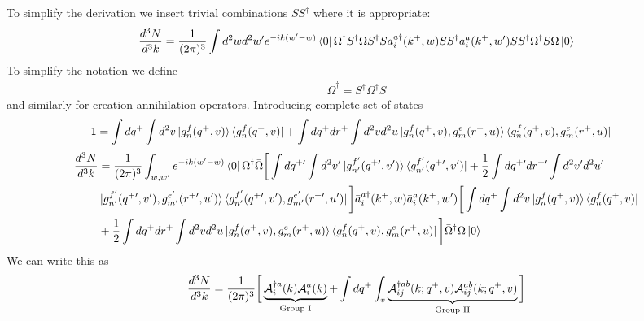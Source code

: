 \documentclass[aps,prd,amsmath,amssymb,nofootinbib]{revtex4-2}
\numberwithin{equation}{section}
\begin{document}
To simplify the derivation we insert trivial combinations $S S^\dagger$ where it is appropriate: 
\begin{equation}
\frac{d^3  N}{d^3 k} = \frac{1}{(2\pi)^{3}}\int  d^{2}w d^{2} w^\prime 
e^{-ik (w^{\prime}-w)}
\bra{0}\Omega^{\dagger} S^{\dagger}\Omega  S^\dagger  S a^{a\dagger}_{i}(k^{+},w) 
 S S^\dagger a^{a}_{i} (k^{+} , w^\prime)  S S^\dagger  \Omega^{\dagger} S\Omega\ket{0}
\end{equation}
To simplify the notation we define 
\begin{align}
   \bar \Omega^\dagger =  S^\dagger \Omega^\dagger S  
\end{align}
and similarly for creation annihilation operators. Introducing complete set of states
\begin{align}
    \mathsf{1} & = \int dq^{+} \int d^{2}v \ket{g^{f}_{n}(q^{+},v)}\bra{g^{f}_{n}(q^{+},v)} + \int dq^{+} dr^{+} \int d^{2}v d^{2}u \ket{g^{f}_{n}(q^{+},v),g^{e}_{m}(r^{+},u)}\bra{g^{f}_{n}(q^{+},v),g^{e}_{m}(r^{+},u)}
\end{align}
\begin{align}
\frac{d^3  N}{d^3 k} &  = \frac{1}{(2\pi)^{3}}\int_{w,w^\prime} e^{-i k (w^{\prime}-w)}\bra{0}\Omega^{\dagger}\bar{\Omega} \bigg[ \int dq^{+\prime} \int d^{2}v^{\prime} \ket{g^{f^{\prime}}_{n^{\prime}}(q^{+\prime},v^{\prime})}\bra{g^{f^{\prime}}_{n^{\prime}}(q^{+\prime},v^{\prime})}  + \frac{1}{2}\int dq^{+\prime} dr^{+\prime} \int d^{2}v^{\prime} d^{2}u^{\prime} \notag \\ &\ket{g^{f^{\prime}}_{n^{\prime}}(q^{+\prime},v^{\prime}),g^{e^{\prime}}_{m^{\prime}}(r^{+\prime},u^{\prime})}\bra{g^{f^{\prime}}_{n^{\prime}}(q^{+\prime},v^{\prime}),g^{e^{\prime}}_{m^{\prime}}(r^{+\prime},u^{\prime})}\bigg]\bar a^{a\dagger }_{i} (k^{+} , w)\bar a^{a}_{i} (k^{+} , w^\prime)\bigg[ \int dq^{+} \int d^{2}v \ket{g^{f}_{n}(q^{+},v)}\bra{g^{f}_{n}(q^{+},v)} \notag \\ & + \frac{1}{2}\int dq^{+} dr^{+} \int d^{2}v d^{2}u \ket{g^{f}_{n}(q^{+},v),g^{e}_{m}(r^{+},u)}\bra{g^{f}_{n}(q^{+},v),g^{e}_{m}(r^{+},u)} \bigg]\bar \Omega^{\dagger} \Omega\ket{0}
\end{align}
We can write this as
\begin{equation}
    \frac{d^3  N}{d^3 k}   = \frac{1}{(2\pi)^{3}}\bigg[\underbrace{{\cal A}^{\dagger a}_{i}(k){\cal A}^{a}_{i}(k)}_{\text{Group I}} + 
    \int dq^+ \int_v
    \underbrace{{\cal A}^{\dagger ab}_{ij}(k; q^+, v){\cal A}^{ab}_{ij}(k; q^+, v)}_{\text{Group II}}\bigg]
\end{equation}
\end{document}
